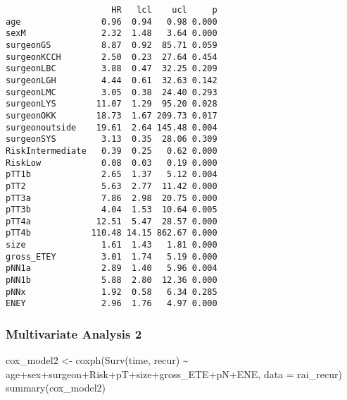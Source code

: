 \documentclass[
  letterpaper,
  DIV=11,
  numbers=noendperiod]{scrartcl}
\newenvironment{Shaded}{\begin{snugshade}}{\end{snugshade}}
\newcommand{\AttributeTok}[1]{\textcolor[rgb]{0.40,0.45,0.13}{#1}}
\newcommand{\FunctionTok}[1]{\textcolor[rgb]{0.28,0.35,0.67}{#1}}
\newcommand{\NormalTok}[1]{\textcolor[rgb]{0.00,0.23,0.31}{#1}}
\newcommand{\OtherTok}[1]{\textcolor[rgb]{0.00,0.23,0.31}{#1}}
\newcommand{\SpecialCharTok}[1]{\textcolor[rgb]{0.37,0.37,0.37}{#1}}
\begin{document}
\begin{verbatim}
                     HR   lcl    ucl     p
age                0.96  0.94   0.98 0.000
sexM               2.32  1.48   3.64 0.000
surgeonGS          8.87  0.92  85.71 0.059
surgeonKCCH        2.50  0.23  27.64 0.454
surgeonLBC         3.88  0.47  32.25 0.209
surgeonLGH         4.44  0.61  32.63 0.142
surgeonLMC         3.05  0.38  24.40 0.293
surgeonLYS        11.07  1.29  95.20 0.028
surgeonOKK        18.73  1.67 209.73 0.017
surgeonoutside    19.61  2.64 145.48 0.004
surgeonSYS         3.13  0.35  28.06 0.309
RiskIntermediate   0.39  0.25   0.62 0.000
RiskLow            0.08  0.03   0.19 0.000
pTT1b              2.65  1.37   5.12 0.004
pTT2               5.63  2.77  11.42 0.000
pTT3a              7.86  2.98  20.75 0.000
pTT3b              4.04  1.53  10.64 0.005
pTT4a             12.51  5.47  28.57 0.000
pTT4b            110.48 14.15 862.67 0.000
size               1.61  1.43   1.81 0.000
gross_ETEY         3.01  1.74   5.19 0.000
pNN1a              2.89  1.40   5.96 0.004
pNN1b              5.88  2.80  12.36 0.000
pNNx               1.92  0.58   6.34 0.285
ENEY               2.96  1.76   4.97 0.000
\end{verbatim}

\subsubsection{Multivariate Analysis 2}\label{multivariate-analysis-2}

\begin{Shaded}
\begin{Highlighting}[]
\NormalTok{cox\_model2 }\OtherTok{\textless{}{-}} \FunctionTok{coxph}\NormalTok{(}\FunctionTok{Surv}\NormalTok{(time, recur) }\SpecialCharTok{\textasciitilde{}}\NormalTok{ age}\SpecialCharTok{+}\NormalTok{sex}\SpecialCharTok{+}\NormalTok{surgeon}\SpecialCharTok{+}\NormalTok{Risk}\SpecialCharTok{+}\NormalTok{pT}\SpecialCharTok{+}\NormalTok{size}\SpecialCharTok{+}\NormalTok{gross\_ETE}\SpecialCharTok{+}\NormalTok{pN}\SpecialCharTok{+}\NormalTok{ENE, }\AttributeTok{data =}\NormalTok{ rai\_recur)}
\FunctionTok{summary}\NormalTok{(cox\_model2)}
\end{Highlighting}
\end{Shaded}
\end{document}
